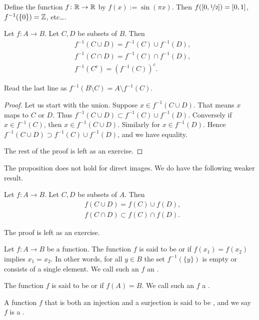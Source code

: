 \begin{example}
Define the function $f \colon {\mathbb{R}} \to {\mathbb{R}}$ by
$f(x) := \sin(\pi x)$.  Then $f([0,\nicefrac{1}{2}]) = [0,1]$, 
$f^{-1}(\{0\}) = {\mathbb{Z}}$, etc\ldots.
\end{example}

\begin{prop} \label{st:propinv}
Let $f \colon A \to B$.  Let $C, D$ be subsets of $B$.  Then
\begin{align*}
& f^{-1}( C \cup D) = f^{-1} (C) \cup f^{-1} (D) , \\
& f^{-1}( C \cap D) = f^{-1} (C) \cap f^{-1} (D) , \\
& f^{-1}( C^c) = {\left( f^{-1} (C) \right)}^c .
\end{align*}
\end{prop}

Read the last line as
$f^{-1}( B \setminus C) = A \setminus f^{-1} (C)$.

\begin{proof}
Let us start with the union.  Suppose $x \in 
f^{-1}( C \cup D)$.  That means 
$x$ maps to $C$ or $D$.  Thus
$f^{-1}( C \cup D) \subset f^{-1} (C) \cup f^{-1} (D)$.  Conversely
if $x \in f^{-1}(C)$, then $x \in f^{-1}(C \cup D)$.  Similarly for
$x \in f^{-1}(D)$.  Hence
$f^{-1}( C \cup D) \supset f^{-1} (C) \cup f^{-1} (D)$, and we have
equality.

The rest of the proof is left as an exercise.
\end{proof}

The proposition does not hold for direct images.  We do have
the following weaker result.

\begin{prop} \label{st:propfor}
Let $f \colon A \to B$.  Let $C, D$ be subsets of $A$.  Then
\begin{align*}
& f( C \cup D) = f (C) \cup f (D) , \\
& f( C \cap D) \subset f (C) \cap f (D) .
\end{align*}
\end{prop}

The proof is left as an exercise.

\begin{defn}
Let $f \colon A \to B$ be a function.
The function $f$ is said to be
\emph{} or
\emph{} if $f(x_1) = f(x_2)$ implies $x_1 = x_2$.  In
other words,
for all $y \in B$ the set
$f^{-1}(\{y\})$ is empty or consists of a single element.
We call such an $f$ an \emph{}.

The function $f$ is said to be
\emph{} or
\emph{} if $f(A) = B$.
We call such an $f$ a \emph{}.

A function $f$ that is both an injection and a surjection is
said to be \emph{}, and we say $f$ is a
\emph{}.
\end{defn}

